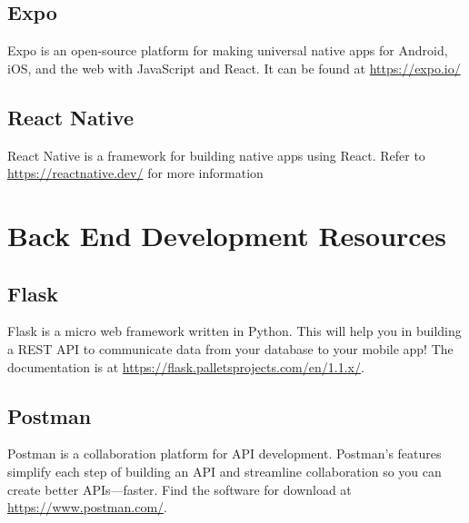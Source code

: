 \documentclass[]{book}
\begin{document}
\subsection{Expo}\label{expo}

Expo is an open-source platform for making universal native apps for
Android, iOS, and the web with JavaScript and React. It can be found at
\url{https://expo.io/}

\subsection{React Native}\label{react-native}

React Native is a framework for building native apps using React. Refer
to \url{https://reactnative.dev/} for more information

\section{Back End Development
Resources}\label{back-end-development-resources}

\subsection{Flask}\label{flask}

Flask is a micro web framework written in Python. This will help you in
building a REST API to communicate data from your database to your
mobile app! The documentation is at
\url{https://flask.palletsprojects.com/en/1.1.x/}.

\subsection{Postman}\label{postman}

Postman is a collaboration platform for API development. Postman's
features simplify each step of building an API and streamline
collaboration so you can create better APIs---faster. Find the software
for download at \url{https://www.postman.com/}.


\end{document}
